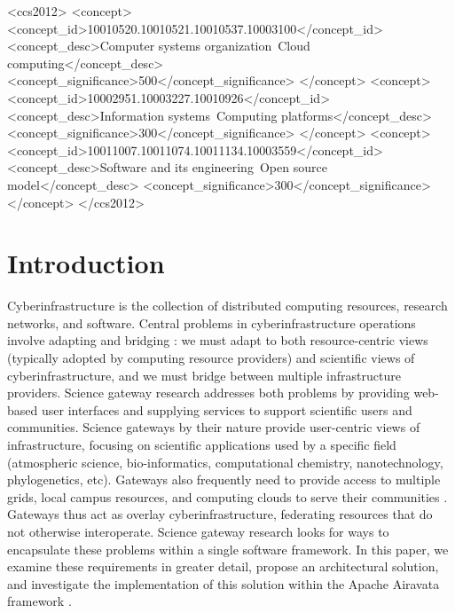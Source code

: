 \documentclass[sigconf]{acmart}
\begin{document}
%
%
\begin{CCSXML}
<ccs2012>
<concept>
<concept_id>10010520.10010521.10010537.10003100</concept_id>
<concept_desc>Computer systems organization~Cloud computing</concept_desc>
<concept_significance>500</concept_significance>
</concept>
<concept>
<concept_id>10002951.10003227.10010926</concept_id>
<concept_desc>Information systems~Computing platforms</concept_desc>
<concept_significance>300</concept_significance>
</concept>
<concept>
<concept_id>10011007.10011074.10011134.10003559</concept_id>
<concept_desc>Software and its engineering~Open source model</concept_desc>
<concept_significance>300</concept_significance>
</concept>
</ccs2012>
\end{CCSXML}



\maketitle

\section{Introduction}

Cyberinfrastructure is the collection of distributed computing resources, research networks, and software. Central problems in cyberinfrastructure operations involve adapting and bridging \cite{hey2005cyberinfrastructure}: we must adapt to both resource-centric views (typically adopted by computing resource providers) and scientific views of cyberinfrastructure, and we must bridge between multiple infrastructure providers. Science gateway research addresses both problems by providing web-based user interfaces and supplying services to support scientific users and communities. Science gateways by their nature provide user-centric views of infrastructure, focusing on scientific applications used by a specific field (atmospheric science, bio-informatics, computational chemistry, nanotechnology, phylogenetics, etc). Gateways also frequently need to provide access to multiple grids, local campus resources, and computing clouds to serve their communities \cite{perera2008workflow}. Gateways thus act as overlay cyberinfrastructure, federating resources that do not otherwise interoperate. Science gateway research looks for ways to encapsulate these problems within a single software framework. In this paper, we examine these requirements in greater detail, propose an architectural solution, and investigate the implementation of this solution within the Apache Airavata framework \cite{marru2011apache,marru2015apache}. 
\end{document}
